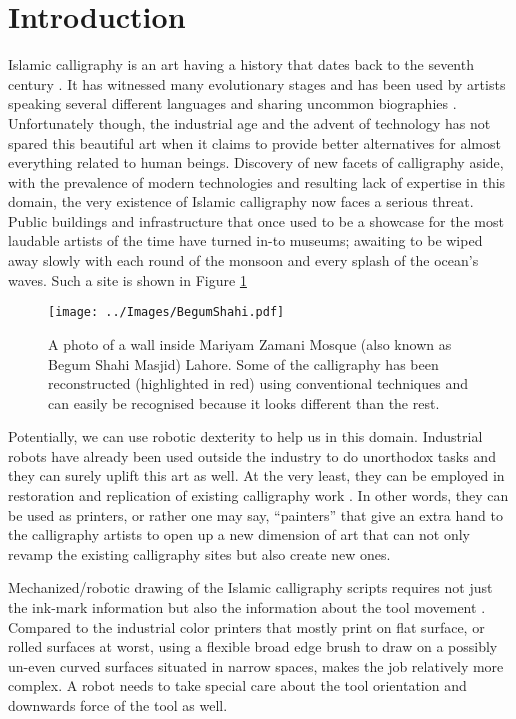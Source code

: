 \section{Introduction}
\label{Chapter:Introduction}
{
    Islamic calligraphy is an art having a history that dates back to the seventh century \cite{bib01, bib02}. It has witnessed many evolutionary stages \cite{bib02, bib03} and has been used by artists speaking several different languages \cite{bib04} and sharing uncommon biographies \cite{bib05,bib06,bib07,bib08}. Unfortunately though, the industrial age and the advent of technology has not spared this beautiful art when it claims to provide better alternatives for almost everything related to human beings. Discovery of new facets of calligraphy aside, with the prevalence of modern technologies and resulting lack of expertise in this domain, the very existence of Islamic calligraphy now faces a serious threat. Public buildings and infrastructure that once used to be a showcase for the most laudable artists of the time have turned in-to museums; awaiting to be wiped away slowly with each round of the monsoon and every splash of the ocean’s waves. Such a site is shown in Figure \ref{Fig:BegumShahi}


    \begin{figure}
      \centering
      \texttt{[image: ../Images/BegumShahi.pdf]}
      \caption{A photo of a wall inside Mariyam Zamani Mosque (also known as Begum Shahi Masjid) Lahore. Some of the calligraphy has been reconstructed (highlighted in red) using conventional techniques and can easily be recognised because it looks different than the rest.
      } \label{Fig:BegumShahi}
    \end{figure}


    Potentially, we can use robotic dexterity to help us in this domain. Industrial robots have already been used outside the industry to do unorthodox tasks \cite{bib09, bib10,bib11,bib12} and they can surely uplift this art as well. At the very least, they can be employed in restoration and replication of existing calligraphy work \cite{bib13}. In other words, they can be used as printers, or rather one may say, “painters” that give an extra hand to the calligraphy artists to open up a new dimension of art that can not only revamp the existing calligraphy sites but also create new ones.

    Mechanized/robotic drawing of the Islamic calligraphy scripts requires not just the ink-mark information but also the information about the tool movement \cite{bib03}. Compared to the industrial color printers that mostly print on flat surface, or rolled surfaces at worst, using a flexible broad edge brush to draw on a possibly un-even curved surfaces situated in narrow spaces, makes the job relatively more complex. A robot needs to take special care about the tool orientation and downwards force of the tool as well.

}
